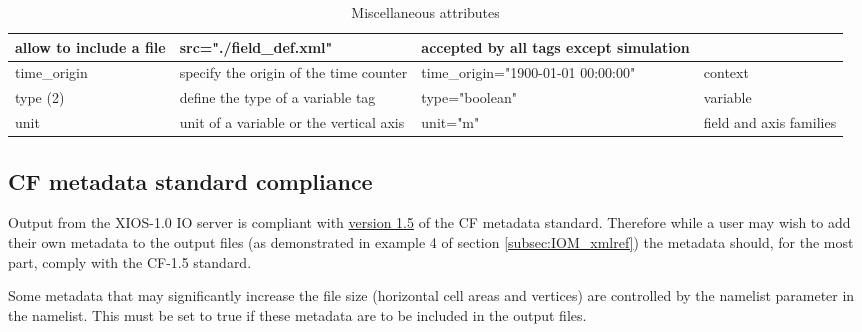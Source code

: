 \documentclass[../tex_main/NEMO_manual]{subfiles}
\begin{document}
\begin{table}
\begin{tabularx}{\textwidth}{|l|X|X|X|}
		allow to include a file                                                                              &
		src="./field\_def.xml"                                                                               &
		accepted by all tags except simulation \\ \hline
		time\_origin                                                                                         &
		specify the origin of the time counter                                                               &
		time\_origin="1900-01-01 00:00:00"                                                                   &
		context                                \\ \hline
		type (2)                                                                                             &
		define the type of a variable tag                                                                    &
		type="boolean"                                                                                       &
		variable                               \\ \hline
		unit                                                                                                 &
		unit of a variable or the vertical axis                                                              &
		unit="m"                                                                                             &
		field and axis families                \\ \hline
	\end{tabularx}
	\caption{Miscellaneous attributes}
\end{table}

\subsection{CF metadata standard compliance}

Output from the XIOS-1.0 IO server is compliant with 
\href{http://cfconventions.org/Data/cf-conventions/cf-conventions-1.5/build/cf-conventions.html}{version 1.5} 
of the CF metadata standard. 
Therefore while a user may wish to add their own metadata to the output files (as demonstrated in 
example 4 of section \autoref{subsec:IOM_xmlref}) the metadata should, for the most part, comply with 
the CF-1.5 standard.

Some metadata that may significantly increase the file size (horizontal cell areas and 
vertices) are controlled by the namelist parameter  in the  namelist.
This must be set to true if these metadata are to be included in the output files.
\end{document}
